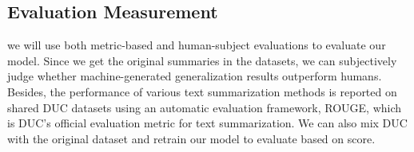 \documentclass[conference]{IEEEtran}
\begin{document}
\subsection{Evaluation Measurement}
we will use both metric-based and human-subject evaluations to evaluate our model. Since we get the original summaries in the datasets, we can subjectively judge whether machine-generated generalization results outperform humans.  Besides, the performance of various text summarization methods is reported on shared DUC datasets using an automatic evaluation framework, ROUGE, which is DUC’s official evaluation metric for text summarization. We can also mix DUC with the original dataset and retrain our model to evaluate based on score.


\end{document}
